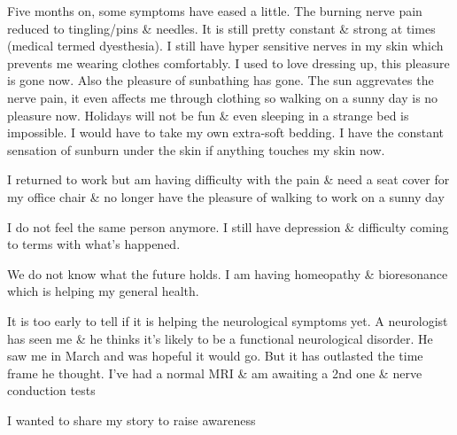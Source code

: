 {Five months on, some symptoms have eased a little. The burning nerve pain
reduced to tingling/pins \& needles. It is still pretty constant \& strong at
times (medical termed dyesthesia). I still have hyper sensitive nerves in my
skin which prevents me wearing clothes comfortably. I used to love dressing up,
this pleasure is gone now. Also the pleasure of sunbathing has gone. The sun
aggrevates the nerve pain, it even affects me through clothing so walking on a
sunny day is no pleasure now. Holidays will not be fun \& even sleeping in a
strange bed is impossible. I would have to take my own extra-soft bedding. I
have the constant sensation of sunburn under the skin if anything touches my
skin now.

I returned to work but am having difficulty with the pain \& need a seat cover
for my office chair \& no longer have the pleasure of walking to work on a sunny
day

I do not feel the same person anymore. I still have depression \& difficulty
coming to terms with what’s happened.

We do not know what the future holds. I am having homeopathy \& bioresonance
which is helping my general health.

It is too early to tell if it is helping the neurological symptoms yet. A
neurologist has seen me \& he thinks it’s likely to be a functional neurological
disorder. He saw me in March and was hopeful it would go. But it has outlasted
the time frame he thought. I’ve had a normal MRI \& am awaiting a 2nd one \&
nerve conduction tests

I wanted to share my story to raise awareness

}
